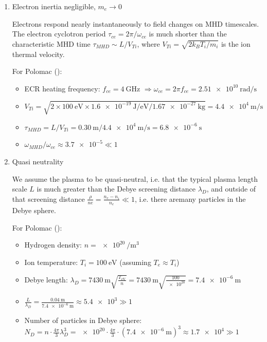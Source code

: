 \begin{enumerate}
\begin{enumerate}

\item Electron inertia negligible, $m_e \to 0$

Electrons respond nearly instantaneously to field changes on MHD timescales. 
The electron cyclotron period $\tau_{ce} = 2\pi/\omega_{ce}$ is much shorter 
than the characteristic MHD time $\tau_{MHD} \sim L/V_{Ti}$, where 
$V_{Ti} = \sqrt{2 k_B T_i / m_i}$ is the ion thermal velocity.

For Polomac (\cite{Elio2024}):
\begin{itemize}
    \item ECR heating frequency: $f_{ce} = \SI{4}{\giga\hertz}$ 
          $\Rightarrow \omega_{ce} = 2\pi f_{ce} = \SI{2.51e10}{\radian\per\second}$
    \item $V_{Ti} = \sqrt{2 \times \SI{100}{\electronvolt} \times \SI{1.6e-19}{\joule\per\electronvolt} / \SI{1.67e-27}{\kilo\gram}} = \SI{4.4e4}{\meter\per\second}$
    \item $\tau_{MHD} = L/V_{Ti} = \SI{0.30}{\meter} / \SI{4.4e4}{\meter\per\second} = \SI{6.8e-6}{\second}$
    \item $\omega_{MHD}/\omega_{ce} \approx \num{3.7e-5} \ll 1$
\end{itemize}




\item Quasi neutrality 

We assume the plasma to be quasi-neutral, i.e. that the typical plasma length scale $L$ is much greater than the Debye screening distance $\lambda_D$, and outside of that screening distance $\frac{\rho}{ne} = \frac{n_e - n_i}{n_e} \ll 1$, i.e. there aremany particles in the Debye sphere.

For Polomac (\cite{Elio2024}):
\begin{itemize}
    \item Hydrogen density: $n = \SI{e20}{\per\meter\cubed}$
    \item Ion temperature: $T_i = \SI{100}{\electronvolt}$ (assuming $T_e \approx T_i$)
    \item Debye length: $\lambda_D = \SI{7430}{\meter} \sqrt{\frac{T_{\text{eV}}}{n}} = \SI{7430}{\meter} \sqrt{\frac{100}{\num{e20}}} = \SI{7.4e-6}{\meter}$
    \item $\frac{L}{\lambda_D} = \frac{\SI{0.04}{\meter}}{\SI{7.4e-6}{\meter}} \approx \num{5.4e3} \gg 1$
    \item Number of particles in Debye sphere: $N_D = n \cdot \frac{4\pi}{3} \lambda_D^3 = \num{e20} \cdot \frac{4\pi}{3} \cdot (\SI{7.4e-6}{\meter})^3 \approx \num{1.7e4} \gg 1$ 
\end{itemize}


\end{enumerate}
\end{enumerate}
